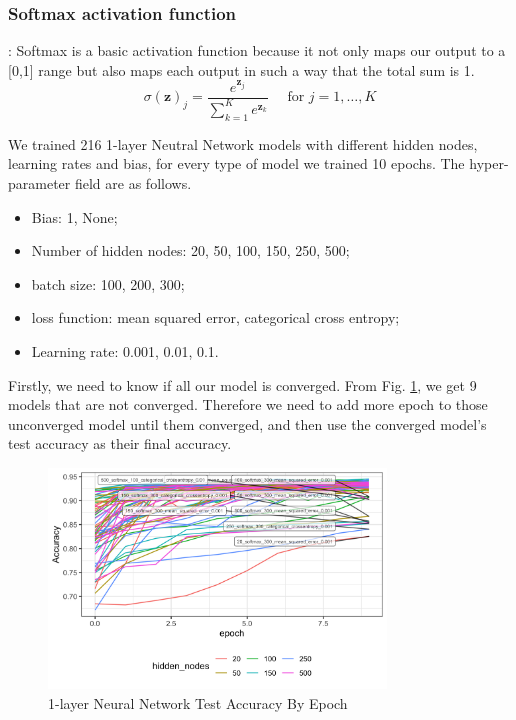 \documentclass[8pt]{beamer}
\begin{document}
\subsubsection{Softmax activation function}\label{Softmax activation function}
\begin{frame}[allowframebreaks]{\secname : \subsecname}{\subsubsecname}
Softmax is a basic activation function because it not only maps our output to a [0,1] range but also maps each output in such a way that the total sum is 1.
$$
\sigma(\mathbf{z})_{j}=\frac{e^{\mathbf{z}_{j}}}{\sum_{k=1}^{K} e^{\mathbf{z}_{k}}} \quad \text { for } j=1, \ldots, K
$$

We trained 216 1-layer Neutral Network models with different hidden nodes, learning rates and bias, for every type of model we trained 10 epochs. The hyper-parameter field are as follows.
\begin{itemize}
  \item Bias: 1, None;
  \item Number of hidden nodes: 20, 50, 100, 150, 250, 500;
  \item batch size: 100, 200, 300;
  \item loss function: mean squared error, categorical cross entropy;
  \item Learning rate: 0.001, 0.01, 0.1.
\end{itemize}



\framebreak
Firstly, we need to know if all our model is converged. From Fig. \ref{1-layer Neural Network Test Accuracy By Epoch}, we get 9 models that are not converged. Therefore we need to add more epoch to those unconverged model until them converged, and then use the converged model's test accuracy as their final accuracy. 
\begin{figure}[htbp]
\centerline{\includegraphics[width=0.8\textwidth]{figure/1-layer Neural Network Test Accuracy By Epoch.png}}
\caption{1-layer Neural Network Test Accuracy By Epoch}
\label{1-layer Neural Network Test Accuracy By Epoch}
\vspace{-1.5em}
\end{figure}



\end{frame}
\end{document}
